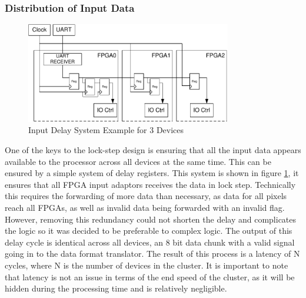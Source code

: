 \subsubsection{Distribution of Input Data}
\begin{figure}[!h]
  \centering
  \includegraphics[width=0.8\textwidth]{./figs/input_delay.pdf}
  \caption{Input Delay System Example for 3 Devices}
  \label{fig:delay}
\end{figure}
One of the keys to the lock-step design is ensuring that all the input data appears available to the processor across all devices at the same time. This can be ensured by a simple system of delay registers. This system is shown in figure \ref{fig:delay}, it ensures that all FPGA input adaptors receives the data in lock step. Technically this requires the forwarding of more data than necessary, as data for all pixels reach all FPGAs, as well as invalid data being forwarded with an invalid flag. However, removing this redundancy could not shorten the delay and complicates the logic so it was decided to be preferable to complex logic. The output of this delay cycle is identical across all devices, an 8 bit data chunk with a valid signal going in to the data format translator. The result of this process is a latency of N cycles, where N is the number of devices in the cluster. It is important to note that latency is not an issue in terms of the end speed of the cluster, as it will be hidden during the processing time and is relatively negligible. 






